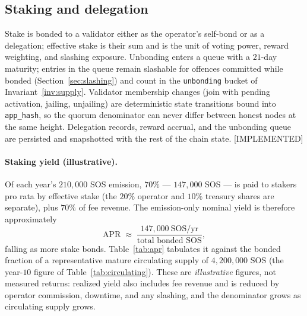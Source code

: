 \documentclass[11pt]{article}
\newcommand{\code}[1]{\texttt{#1}}
\newcommand{\statusI}{\textcolor{statgreen}{\textsf{\scriptsize[IMPLEMENTED]}}}
\theoremstyle{plain}
\theoremstyle{definition}
\theoremstyle{remark}
\begin{document}
\subsection{Staking and delegation}
\label{sec:staking}

Stake is bonded to a validator either as the operator's self-bond or as a
delegation; effective stake is their sum and is the unit of voting power,
reward weighting, and slashing exposure. Unbonding enters a queue with a
$21$-day maturity; entries in the queue remain slashable for offences
committed while bonded (Section~\ref{sec:slashing}) and count in the
\code{unbonding} bucket of Invariant~\ref{inv:supply}. Validator membership
changes (join with pending activation, jailing, unjailing) are
deterministic state transitions bound into \code{app\_hash}, so the quorum
denominator can never differ between honest nodes at the same height.
Delegation records, reward accrual, and the unbonding queue are persisted
and snapshotted with the rest of the chain state. \statusI{}

\paragraph{Staking yield (illustrative).} Of each year's $210{,}000$ SOS
emission, $70\%$ --- $147{,}000$ SOS --- is paid to stakers pro rata by
effective stake (the $20\%$ operator and $10\%$ treasury shares are separate),
plus $70\%$ of fee revenue. The emission-only nominal yield is therefore
approximately
\[
\mathrm{APR} \;\approx\; \frac{147{,}000\ \text{SOS/yr}}{\text{total bonded SOS}},
\]
falling as more stake bonds. Table~\ref{tab:apr} tabulates it against the
bonded fraction of a representative mature circulating supply of
$4{,}200{,}000$ SOS (the year-$10$ figure of Table~\ref{tab:circulating}).
These are \emph{illustrative} figures, not measured returns: realized yield
also includes fee revenue and is reduced by operator commission, downtime, and
any slashing, and the denominator grows as circulating supply grows.

\begin{table}[ht]\centering
{}
\caption{Illustrative emission-only staking APR versus the bonded fraction of a
representative $4{,}200{,}000$ SOS circulating supply. Illustrative, not
measured; excludes fees, commission, downtime, and slashing.}
\label{tab:apr}
\end{table}
\end{document}
